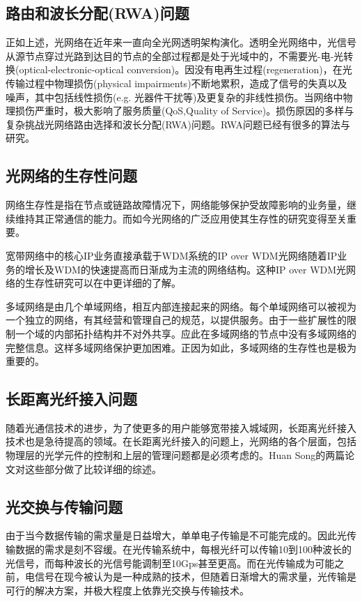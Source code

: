 \documentclass[11pt,twocolumn]{ctexart}
\begin{document}
\subsection{路由和波长分配(RWA)问题}
正如上述，光网络在近年来一直向全光网透明架构演化。透明全光网络中，光信号从源节点穿过光路到达目的节点的全部过程都是处于光域中的，不需要光-电-光转换(optical-electronic-optical conversion)。因没有电再生过程(regeneration)，在光传输过程中物理损伤(physical impairments)不断地累积，造成了信号的失真以及噪声，其中包括线性损伤(e.g. 光器件干扰等)及更复杂的非线性损伤。当网络中物理损伤严重时，极大影响了服务质量(QoS,Quality of Service)。损伤原因的多样与复杂挑战光网络路由选择和波长分配(RWA)问题。RWA问题已经有很多的算法与研究。

\subsection{光网络的生存性问题}
网络生存性是指在节点或链路故障情况下，网络能够保护受故障影响的业务量，继续维持其正常通信的能力。而如今光网络的广泛应用使其生存性的研究变得至关重要。

宽带网络中的核心IP业务直接承载于WDM系统的IP over WDM光网络随着IP业务的增长及WDM的快速提高而日渐成为主流的网络结构。这种IP over WDM光网络的生存性研究可以在\cite{10}中更详细的了解。

多域网络是由几个单域网络，相互内部连接起来的网络。每个单域网络可以被视为一个独立的网络，有其经营和管理自己的规范，以提供服务。由于一些扩展性的限制一个域的内部拓扑结构并不对外共享。应此在多域网络的节点中没有多域网络的完整信息。这样多域网络保护更加困难。正因为如此，多域网络的生存性也是极为重要的。\cite{2}

\subsection{长距离光纤接入问题}
随着光通信技术的进步，为了使更多的用户能够宽带接入城域网，长距离光纤接入技术也是急待提高的领域。在长距离光纤接入的问题上，光网络的各个层面，包括物理层的光学元件的控制和上层的管理问题都是必须考虑的。Huan Song的两篇论文\cite{3,4}对这些部分做了比较详细的综述。

\subsection{光交换与传输问题}
由于当今数据传输的需求量是日益增大，单单电子传输是不可能完成的。因此光传输数据的需求是刻不容缓。在光传输系统中，每根光纤可以传输10到100种波长的光信号，而每种波长的光信号能调制至10Gps甚至更高。而在光传输成为可能之前，电信号在现今被认为是一种成熟的技术，但随着日渐增大的需求量，光传输是可行的解决方案，并极大程度上依靠光交换与传输技术。
\end{document}
